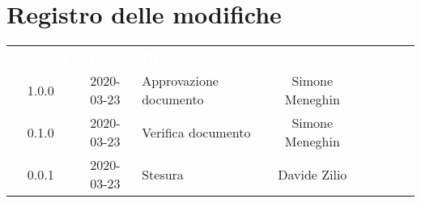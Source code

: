 \section*{Registro delle modifiche}
{
	\centering
	\begin{longtable}{ c c  C{4cm}  c  c }
		\textcolor{white}{\textbf{Versione}} & \textcolor{white}{\textbf{Data}} & \textcolor{white}{\textbf{Descrizione}} & \textcolor{white}{\textbf{Nominativo}} & \textcolor{white}{\textbf{Ruolo}}\\		
		1.0.0 & 2020-03-23 & Approvazione documento & Simone Meneghin &\RdP{}\\		
		0.1.0 & 2020-03-23 & Verifica documento & Simone Meneghin &\ver{}\\		
		0.0.1 & 2020-03-23 & Stesura & Davide Zilio &\reda{}\\		
		
	\end{longtable}

}